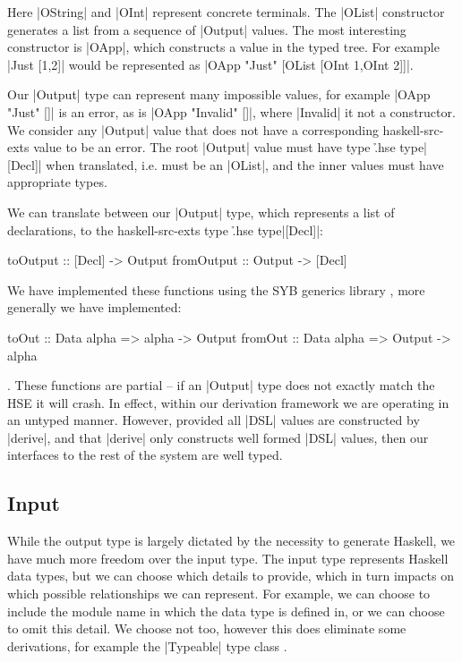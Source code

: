 \documentclass[preprint,draft]{sigplanconf}
\begin{document}
Here |OString| and |OInt| represent concrete terminals. The |OList| constructor generates a list from a sequence of  |Output| values. The most interesting constructor is |OApp|, which constructs a value in the typed tree. For example |Just [1,2]| would be represented as |OApp "Just" [OList [OInt 1,OInt 2]]|.

Our |Output| type can represent many impossible values, for example |OApp "Just" []| is an error, as is |OApp "Invalid" []|, where |Invalid| it not a constructor. We consider any |Output| value that does not have a corresponding haskell-src-exts value to be an error. The root |Output| value must have type \h{.hse type}|[Decl]| when translated, i.e. must be an |OList|, and the inner values must have appropriate types.

We can translate between our |Output| type, which represents a list of declarations, to the haskell-src-exts type \h{.hse type}|[Decl]|:

\begin{code}
toOutput    :: [Decl] -> Output
fromOutput  :: Output -> [Decl]
\end{code}

We have implemented these functions using the SYB generics library \cite{lammel:syb2}, more generally we have implemented:

\begin{code}
toOut    :: Data alpha => alpha -> Output
fromOut  :: Data alpha => Output -> alpha
\end{code}


. These functions are partial -- if an |Output| type does not exactly match the HSE it will crash. In effect, within our derivation framework we are operating in an untyped manner. However, provided all |DSL| values are constructed by |derive|, and that |derive| only constructs well formed |DSL| values, then our interfaces to the rest of the system are well typed.

\subsection{Input}

While the output type is largely dictated by the necessity to generate Haskell, we have much more freedom over the input type. The input type represents Haskell data types, but we can choose which details to provide, which in turn impacts on which possible relationships we can represent. For example, we can choose to include the module name in which the data type is defined in, or we can choose to omit this detail. We choose not too, however this does eliminate some derivations, for example the |Typeable| type class \cite{lammel:syb}.
\end{document}
